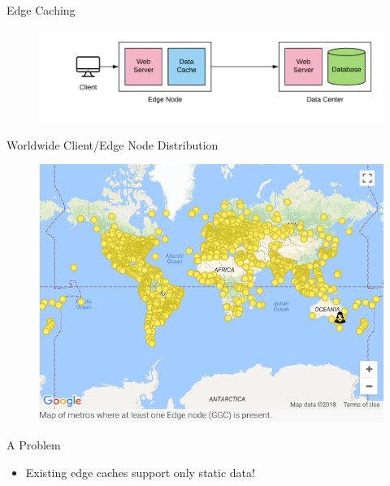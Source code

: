 \documentclass[10pt]{beamer}
\begin{document}
\begin{frame}{Edge Caching}
    \begin{figure}
        \center
        \hspace*{-1.5cm}
        \includegraphics[scale=0.17]{apollo_edge_cache}
    \end{figure}
\end{frame}

\begin{frame}{Worldwide Client/Edge Node Distribution}
    \begin{figure}
        \center
        \includegraphics[scale=0.45]{apollo_google_oceania_en}
    \end{figure}
\end{frame}

\begin{frame}{A Problem}
    \begin{itemize}
        \item{Existing edge caches support only \alert{static data}!}
    \end{itemize}
\end{frame}
\end{document}
